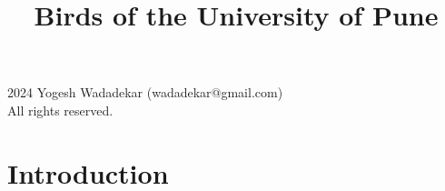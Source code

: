 \documentclass[a4paper,12pt,landscape]{memoir}
\title{Birds of the University of Pune}
\author{}
\date{}
\begin{document}
\maketitle

\begin{center}
\vspace{1cm}
{\large\textcopyright{} 2024 Yogesh Wadadekar (wadadekar@gmail.com)}\\
All rights reserved.
\end{center}

\tableofcontents

\chapter*{Introduction}
\end{document}
